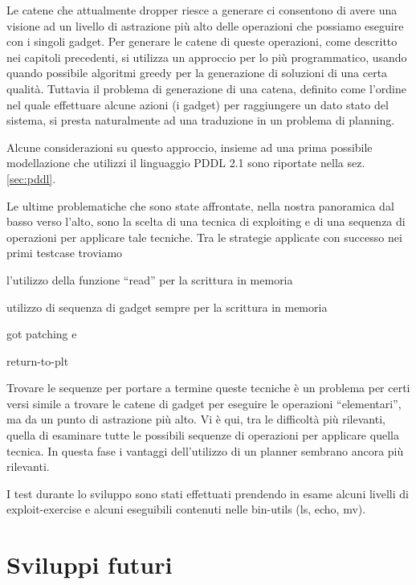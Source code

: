 Le catene che attualmente dropper riesce a generare ci consentono di
avere una visione ad un livello di astrazione più alto delle
operazioni che possiamo eseguire con i singoli gadget. Per generare le
catene di queste operazioni, come descritto nei capitoli precedenti,
si utilizza un approccio per lo più programmatico, usando quando
possibile algoritmi greedy per la generazione di soluzioni di una
certa qualità. Tuttavia il problema di generazione di una catena,
definito come l'ordine nel quale effettuare alcune azioni (i gadget)
per raggiungere un dato stato del sistema, si presta naturalmente ad
una traduzione in un problema di planning.

Alcune considerazioni su questo approccio, insieme ad una prima
possibile modellazione che utilizzi il linguaggio PDDL 2.1
\cite{pddl-97,fox-03} sono riportate nella sez. \ref{sec:pddl}.

Le ultime problematiche che sono state affrontate, nella nostra
panoramica dal basso verso l'alto, sono la scelta di una tecnica di
exploiting e di una sequenza di operazioni per applicare tale
tecniche. Tra le strategie applicate con successo nei primi testcase
troviamo
\begin{inparaenum}[1)]
\item l'utilizzo della funzione ``read'' per la scrittura in memoria
\item utilizzo di sequenza di gadget sempre per la  scrittura in memoria
\item got patching e
\item return-to-plt
\end{inparaenum}

Trovare le sequenze per portare a termine queste tecniche è un
problema per certi versi simile a trovare le catene di gadget per
eseguire le operazioni ``elementari'', ma da un punto di astrazione
più alto.  Vi è qui, tra le difficoltà più rilevanti, quella di
esaminare tutte le possibili sequenze di operazioni per applicare
quella tecnica. In questa fase i vantaggi dell'utilizzo di un planner
sembrano ancora più rilevanti.

I test durante lo sviluppo sono stati effettuati prendendo in esame
alcuni livelli di exploit-exercise\cite{exploit-exercise} e alcuni
eseguibili contenuti nelle bin-utils (ls, echo, mv).

\section{Sviluppi futuri}


